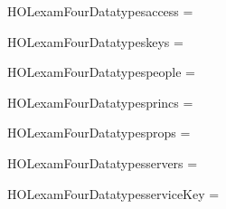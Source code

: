 \newcommand{\HOLexamFourDate}{27 March 2020}
\newcommand{\HOLexamFourTime}{00:28}
\begin{SaveVerbatim}{HOLexamFourDatatypesaccess}
 =  \HOLTokenBar{}  \HOLTokenBar{} 
\end{SaveVerbatim}
\newcommand{\HOLexamFourDatatypesaccess}{\UseVerbatim{HOLexamFourDatatypesaccess}}
\begin{SaveVerbatim}{HOLexamFourDatatypeskeys}
 =  \HOLTokenBar{}  \HOLTokenBar{}  \HOLTokenBar{}  \HOLTokenBar{} 
\end{SaveVerbatim}
\newcommand{\HOLexamFourDatatypeskeys}{\UseVerbatim{HOLexamFourDatatypeskeys}}
\begin{SaveVerbatim}{HOLexamFourDatatypespeople}
 = 
\end{SaveVerbatim}
\newcommand{\HOLexamFourDatatypespeople}{\UseVerbatim{HOLexamFourDatatypespeople}}
\begin{SaveVerbatim}{HOLexamFourDatatypesprincs}
 =   \HOLTokenBar{}   \HOLTokenBar{}  
\end{SaveVerbatim}
\newcommand{\HOLexamFourDatatypesprincs}{\UseVerbatim{HOLexamFourDatatypesprincs}}
\begin{SaveVerbatim}{HOLexamFourDatatypesprops}
 =   \HOLTokenBar{}    \HOLTokenBar{}  
\end{SaveVerbatim}
\newcommand{\HOLexamFourDatatypesprops}{\UseVerbatim{HOLexamFourDatatypesprops}}
\begin{SaveVerbatim}{HOLexamFourDatatypesservers}
 =  \HOLTokenBar{}  \HOLTokenBar{} 
\end{SaveVerbatim}
\newcommand{\HOLexamFourDatatypesservers}{\UseVerbatim{HOLexamFourDatatypesservers}}
\begin{SaveVerbatim}{HOLexamFourDatatypesserviceKey}
 =   \HOLTokenBar{}  
\end{SaveVerbatim}
\newcommand{\HOLexamFourDatatypesserviceKey}{\UseVerbatim{HOLexamFourDatatypesserviceKey}}
\newcommand{\HOLexamFourDatatypes}{
\HOLexamFourDatatypesaccess\HOLexamFourDatatypeskeys\HOLexamFourDatatypespeople\HOLexamFourDatatypesprincs\HOLexamFourDatatypesprops\HOLexamFourDatatypesservers\HOLexamFourDatatypesserviceKey}

